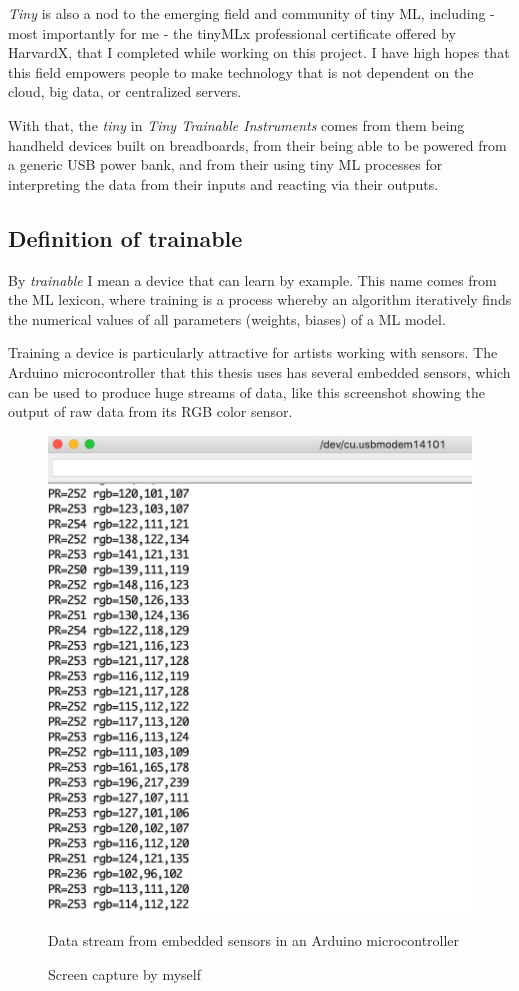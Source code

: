 \emph{Tiny} is also a nod to the emerging field and community of tiny \acrshort{ML}, including - most importantly for me - the tinyMLx professional certificate\cite{website-edx-harvardx-tinymlx-professional-certificate} offered by HarvardX, that I completed while working on this project. I have high hopes that this field empowers people to make technology that is not dependent on the cloud, big data, or centralized servers.

With that, the \emph{tiny} in \emph{Tiny Trainable Instruments} comes from them being handheld devices built on breadboards, from their being able to be powered from a generic USB power bank, and from their using tiny \acrshort{ML} processes for interpreting the data from their inputs and reacting via their outputs.

\subsection{Definition of trainable}

By \emph{trainable} I mean a device that can learn by example. This name comes from the \acrshort{ML} lexicon, where training is a process whereby an algorithm  iteratively finds the numerical values of all parameters (weights, biases) of a \acrshort{ML} model.

Training a device is particularly attractive for artists working with sensors. The Arduino microcontroller that this thesis uses has several embedded sensors, which can be used to produce huge streams of data, like this screenshot showing the output of raw data from its \acrshort{RGB} color sensor.

\begin{figure}[ht]
  \centering
  \includegraphics[width=0.75\linewidth,height=0.40\textheight,keepaspectratio]{images/arduino-data-stream.jpg}
  \caption{Data stream from embedded sensors in an Arduino microcontroller}
  \caption*{Screen capture by myself}
  \label{fig:arduino-data-stream}
\end{figure}

